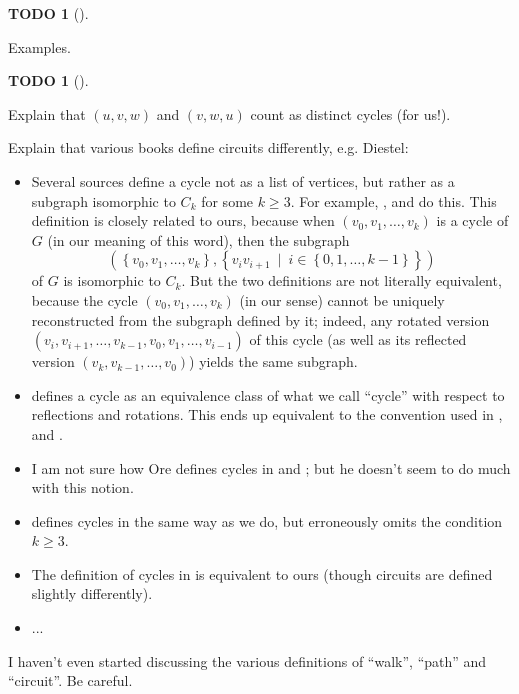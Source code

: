 \documentclass[numbers=enddot,12pt,final,onecolumn,notitlepage]{scrartcl}%
\theoremstyle{definition}
\newtheorem{quest}[theo]{TODO}
\newenvironment{todo}[1][]
{\begin{quest}[#1]\begin{leftbar}}
{\end{leftbar}\end{quest}}
\newcommand{\set}[1]{\left\{ #1 \right\}}
\newcommand{\tup}[1]{\left( #1 \right)}
\begin{document}
\begin{todo}
Examples.
\end{todo}

\begin{todo}
Explain that $\tup{u,v,w}$ and $\tup{v,w,u}$ count as distinct cycles
(for us!).

Explain that various books define circuits differently, e.g. Diestel:
\begin{itemize}
\item Several sources define a cycle not as a list of vertices,
      but rather as a subgraph isomorphic to $C_k$ for some
      $k \geq 3$. For example, \cite{Dieste16}, \cite{BonMur08} and
      \cite{West01} do this. This definition is closely related to
      ours, because when $\tup{v_0, v_1, \ldots, v_k}$ is a cycle of
      $G$ (in our meaning of this word), then the subgraph
      \[
      \tup{ \set{v_0, v_1, \ldots, v_k} ,
            \set{v_i v_{i+1} \ \mid \  i \in \set{0, 1, \ldots, k-1}}
          }
      \]
      of $G$ is isomorphic to $C_k$. But the two definitions are not
      literally equivalent, because the cycle
      $\tup{v_0, v_1, \ldots, v_k}$ (in our sense) cannot be uniquely
      reconstructed from the subgraph defined by it; indeed, any
      rotated version $\tup{v_i, v_{i+1}, \ldots, v_{k-1}, v_0, v_1,
      \ldots, v_{i-1}}$ of this cycle (as well as its reflected
      version $\tup{v_k, v_{k-1}, \ldots, v_0}$) yields the same
      subgraph.
\item \cite{Bollob98} defines a cycle as an equivalence class of what
      we call ``cycle'' with respect to reflections and rotations.
      This ends up equivalent to the convention used in
      \cite{Dieste16}, \cite{BonMur08} and \cite{West01}.
\item I am not sure how Ore defines cycles in \cite{Ore90} and
      \cite{Ore74}; but he doesn't seem to do much with this notion.
\item \cite{Harju14} defines cycles in the same way as we do, but
      erroneously omits the condition $k \geq 3$.
\item The definition of cycles in \cite{BehCha71} is equivalent to
      ours (though circuits are defined slightly differently).
\item ...
\end{itemize}
I haven't even started discussing the various definitions of ``walk'',
``path'' and ``circuit''. Be careful.
\end{todo}

\end{document}
